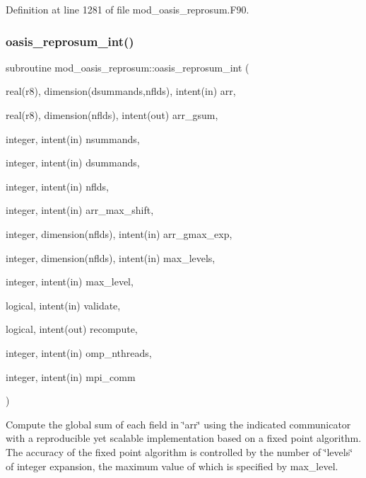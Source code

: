 Definition at line 1281 of file mod\+\_\+oasis\+\_\+reprosum.\+F90.

\mbox{\label{namespacemod__oasis__reprosum_a7ea3c5bad9db10c80eb528453602aed3}} 
\subsubsection{\texorpdfstring{oasis\+\_\+reprosum\+\_\+int()}{oasis\_reprosum\_int()}}
{\footnotesize\ttfamily subroutine mod\+\_\+oasis\+\_\+reprosum\+::oasis\+\_\+reprosum\+\_\+int (\begin{DoxyParamCaption}\item[{real(r8), dimension(dsummands,nflds), intent(in)}]{arr,  }\item[{real(r8), dimension(nflds), intent(out)}]{arr\+\_\+gsum,  }\item[{integer, intent(in)}]{nsummands,  }\item[{integer, intent(in)}]{dsummands,  }\item[{integer, intent(in)}]{nflds,  }\item[{integer, intent(in)}]{arr\+\_\+max\+\_\+shift,  }\item[{integer, dimension(nflds), intent(in)}]{arr\+\_\+gmax\+\_\+exp,  }\item[{integer, dimension(nflds), intent(in)}]{max\+\_\+levels,  }\item[{integer, intent(in)}]{max\+\_\+level,  }\item[{logical, intent(in)}]{validate,  }\item[{logical, intent(out)}]{recompute,  }\item[{integer, intent(in)}]{omp\+\_\+nthreads,  }\item[{integer, intent(in)}]{mpi\+\_\+comm }\end{DoxyParamCaption})\hspace{0.3cm}{\ttfamily [private]}}



Compute the global sum of each field in \char`\"{}arr\char`\"{} using the indicated communicator with a reproducible yet scalable implementation based on a fixed point algorithm. The accuracy of the fixed point algorithm is controlled by the number of \char`\"{}levels\char`\"{} of integer expansion, the maximum value of which is specified by max\+\_\+level. 


